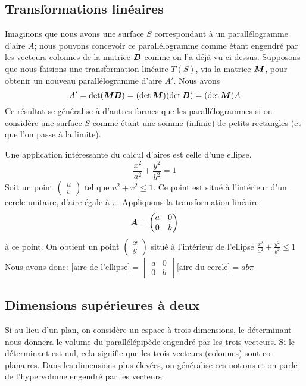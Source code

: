 \subsection{Transformations linéaires}
Imaginons que nous avons une surface $S$ correspondant à
un parallélogramme d'aire $A$; nous pouvons
concevoir ce parallélogramme comme étant engendré
par les vecteurs colonnes de la matrice $\boldsymbol{B}$ comme on
l'a déjà vu ci-dessus.
Supposons que nous faisions une transformation linéaire $T(S)$,
via la matrice $\boldsymbol{M}$,
pour obtenir un nouveau parallélogramme d'aire $A'$. Nous avons
\[
A' = \det(\boldsymbol{M} \boldsymbol{B}) = (\det\boldsymbol{M})(\det\boldsymbol{B}) = (\det\boldsymbol{M}) A
\]
Ce résultat se généralise à d'autres formes que les parallélogrammes
si on considère une surface $S$ comme étant une somme (infinie) de
petits rectangles (et que l'on passe à la limite).
\begin{exemple}
Une application intéressante du calcul d'aires est celle
d'une ellipse.  
\[
\frac{x^2}{a^2} + \frac{y^2}{b^2} = 1
\]
Soit un point $\displaystyle \begin{pmatrix}
u\\v
\end{pmatrix}
$
tel que $u^2 + v^2 \leq 1$.  Ce point est
situé à l'intérieur d'un cercle unitaire, d'aire égale
à $\pi$.
Appliquons la transformation linéaire:
\[
\boldsymbol{A} = 
\begin{pmatrix}
a & 0 \\
0 & b
\end{pmatrix}
\]
à ce point.
On obtient un point $\displaystyle \begin{pmatrix}
x\\y
\end{pmatrix}
$
situé à l'intérieur de l'ellipse
$\displaystyle
\frac{x^2}{a^2} + \frac{y^2}{b^2} \leq 1
$
Nous avons donc:
$\displaystyle
\mbox{[aire de l'ellipse]} = \begin{vmatrix}
a & 0 \\
0 & b
\end{vmatrix}\mbox{[aire du cercle]} = ab \pi
$
\end{exemple}

\subsection{Dimensions supérieures à deux}
Si au lieu d'un plan, on considère un espace à trois dimensions, 
le déterminant nous donnera le volume du parallélépipède engendré par les
trois vecteurs.  Si le déterminant est nul, cela signifie que
les trois vecteurs (colonnes) sont co-planaires.  
Dans les dimensions plus élevées, on généralise ces notions
et on parle de l'hypervolume engendré par les vecteurs.

